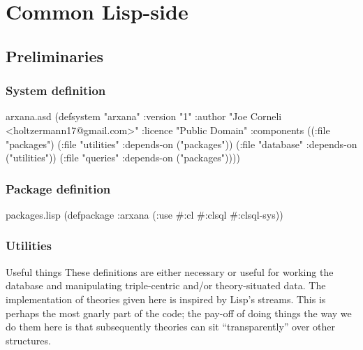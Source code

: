 \section{Common Lisp-side}

\subsection{Preliminaries}

\subsubsection*{System definition}

\begin{common}{arxana.asd}
(defsystem "arxana"
    :version "1"
    :author "Joe Corneli <holtzermann17@gmail.com>"
    :licence "Public Domain"
    :components
    ((:file "packages")
     (:file "utilities" :depends-on ("packages"))
     (:file "database" :depends-on ("utilities"))
     (:file "queries" :depends-on ("packages"))))
\end{common}

\subsubsection*{Package definition}

\begin{common}{packages.lisp}
(defpackage :arxana
  (:use #:cl #:clsql #:clsql-sys))
\end{common}

\subsubsection*{Utilities}

\begin{notate}{Useful things} \label{useful}
These definitions are either necessary or useful for
working the database and manipulating triple-centric
and/or theory-situated data.  The implementation of
theories given here is inspired by Lisp's streams.  This
is perhaps the most gnarly part of the code; the pay-off
of doing things the way we do them here is that
subsequently theories can sit ``transparently'' over other
structures.
\end{notate}

